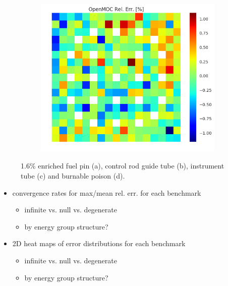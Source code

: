 \begin{figure}[h!]
\begin{subfigure}{.33\textwidth}
  \caption{}
  \label{fig:chap8-assm-1.6-degenerate-capt-8}
\end{subfigure}%
\begin{subfigure}{.33\textwidth}
  \centering
  \includegraphics[width=\linewidth]{figures/quantification/assm-16/degenerate-capt-err-70}
  \caption{}
  \label{fig:chap8-assm-1.6-degenerate-capt-70}
\end{subfigure}
\caption[U-238 capture rate errors for a 1.6\& enriched assembly]{1.6\% enriched fuel pin (a), control rod guide tube (b), instrument tube (c) and burnable poison (d).}
\label{fig:chap8-assm-1.6-capt-err}
\end{figure}

\begin{itemize}[noitemsep]
  \item convergence rates for max/mean rel. err. for each benchmark
  \begin{itemize}[noitemsep]
    \item infinite vs. null vs. degenerate
    \item by energy group structure?
  \end{itemize}
  \item 2D heat maps of error distributions for each benchmark
  \begin{itemize}[noitemsep]
    \item infinite vs. null vs. degenerate
    \item by energy group structure?
  \end{itemize}
\end{itemize}


